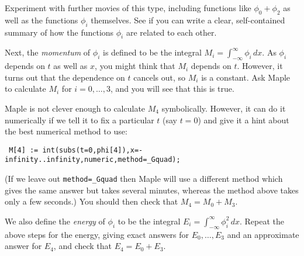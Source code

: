 \documentclass[a4paper,10pt]{amsbook}
\numberwithin{example}{chapter}
\begin{document}
Experiment with further movies of this type, including functions like
$\phi_0+\phi_2$ as well as the functions $\phi_i$ themselves.  See if
you can write a clear, self-contained summary of how the functions
$\phi_i$ are related to each other.

Next, the \emph{momentum} of $\phi_i$ is defined to be the integral
$M_i=\int_{-\infty}^\infty \phi_i\,dx$.  As $\phi_i$ depends on $t$ as
well as $x$, you might think that $M_i$ depends on $t$.  However, it
turns out that the dependence on $t$ cancels out, so $M_i$ is a
constant.  Ask Maple to calculate $M_i$ for $i=0,\dotsc,3$, and you
will see that this is true.

Maple is not clever enough to calculate $M_4$ symbolically.  However,
it can do it numerically if we tell it to fix a particular $t$ (say
$t=0$) and give it a hint about the best numerical method to use:
\begin{verbatim}
 M[4] := int(subs(t=0,phi[4]),x=-infinity..infinity,numeric,method=_Gquad);
\end{verbatim}
(If we leave out \verb~method=_Gquad~ then Maple will use a different
method which gives the same answer but takes several minutes, whereas
the method above takes only a few seconds.)  You should then check
that $M_4=M_0+M_3$.

We also define the \emph{energy} of $\phi_i$ to be the integral
$E_i=\int_{-\infty}^\infty\phi_i^2\,dx$.  Repeat the above steps for
the energy, giving exact answers for $E_0,\dotsc,E_3$ and an
approximate answer for $E_4$, and check that $E_4=E_0+E_3$.
\end{document}

